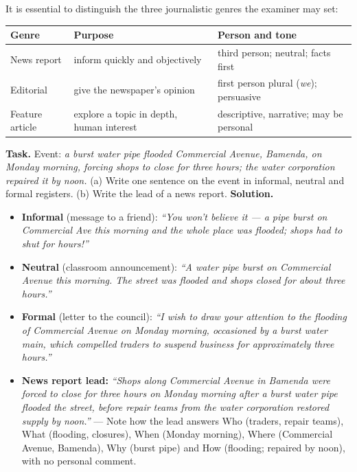 \documentclass[11pt]{article}
\begin{document}
It is essential to distinguish the three journalistic genres the examiner may set:

\begin{center}
\begin{tabularx}{\linewidth}{|l|X|X|}
\hline
\rowcolor{popblueL} \textbf{Genre} & \textbf{Purpose} & \textbf{Person and tone} \\
\hline
News report & inform quickly and objectively & third person; neutral; facts first \\
\hline
Editorial & give the newspaper's opinion & first person plural (\emph{we}); persuasive \\
\hline
Feature article & explore a topic in depth, human interest & descriptive, narrative; may be personal \\
\hline
\end{tabularx}
\end{center}

\begin{exoresolu}
\textbf{Task.} Event: \emph{a burst water pipe flooded Commercial Avenue, Bamenda, on Monday morning, forcing shops to close for three hours; the water corporation repaired it by noon.} (a) Write one sentence on the event in informal, neutral and formal registers. (b) Write the lead of a news report.
\tcblower
\textbf{Solution.}
\begin{itemize}
\item \textbf{Informal} (message to a friend): \emph{``You won't believe it — a pipe burst on Commercial Ave this morning and the whole place was flooded; shops had to shut for hours!''}
\item \textbf{Neutral} (classroom announcement): \emph{``A water pipe burst on Commercial Avenue this morning. The street was flooded and shops closed for about three hours.''}
\item \textbf{Formal} (letter to the council): \emph{``I wish to draw your attention to the flooding of Commercial Avenue on Monday morning, occasioned by a burst water main, which compelled traders to suspend business for approximately three hours.''}
\item \textbf{News report lead:} \emph{``Shops along Commercial Avenue in Bamenda were forced to close for three hours on Monday morning after a burst water pipe flooded the street, before repair teams from the water corporation restored supply by noon.''} — Note how the lead answers Who (traders, repair teams), What (flooding, closures), When (Monday morning), Where (Commercial Avenue, Bamenda), Why (burst pipe) and How (flooding; repaired by noon), with no personal comment.
\end{itemize}
\end{exoresolu}
\end{document}
